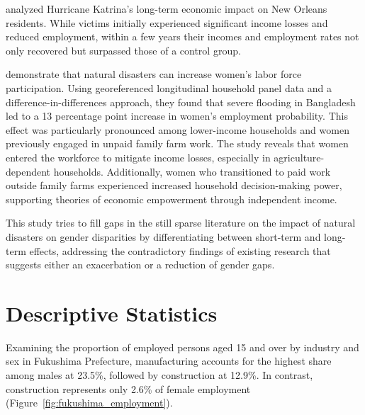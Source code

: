 \documentclass[12pt,halfline,a4paper]{ouparticle}
\begin{document}
\citet{Deryugina2018TheReturns} analyzed Hurricane Katrina's long-term economic impact on New Orleans residents. While victims initially experienced significant income losses and reduced employment, within a few years their incomes and employment rates not only recovered but surpassed those of a control group.


\citet{Canessa2021WomensShocks} demonstrate that natural disasters can increase women's labor force participation. Using georeferenced longitudinal household panel data and a difference-in-differences approach, they found that severe flooding in Bangladesh led to a 13 percentage point increase in women's employment probability. This effect was particularly pronounced among lower-income households and women previously engaged in unpaid family farm work. The study reveals that women entered the workforce to mitigate income losses, especially in agriculture-dependent households. Additionally, women who transitioned to paid work outside family farms experienced increased household decision-making power, supporting theories of economic empowerment through independent income.



This study tries to fill gaps in the still sparse literature on the impact of natural disasters on gender disparities by differentiating between short-term and long-term effects, addressing the contradictory findings of existing research that suggests either an exacerbation or a reduction of gender gaps.


\section{Descriptive Statistics}
\label{sec4}


Examining the proportion of employed persons aged 15 and over by industry and sex in Fukushima Prefecture, manufacturing accounts for the highest share among males at 23.5\%, followed by construction at 12.9\%. In contrast, construction represents only 2.6\% of female employment (Figure~\ref{fig:fukushima_employment}).


\end{document}

